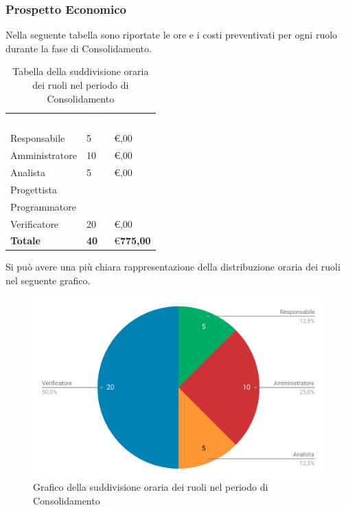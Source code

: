 \subsubsection{Prospetto Economico}
Nella seguente tabella sono riportate le ore e i costi preventivati per ogni ruolo durante la fase di Consolidamento.


\begin{table}[H]	
	\begin{center}
	    \begin{tabular}{C{4cm}C{1cm}C{3,5cm}}
			\textcolor{white}{\textbf{Ruolo}} & \textcolor{white}{\textbf{Ore}} & \textcolor{white}{\textbf{Costo}}
			\\
			Responsabile & 5 & \euro {},00 \\
			Amministratore & 10 & \euro {},00 \\
			Analista & 5 & \euro {},00 \\
			Progettista &  & \\
			Programmatore &  &  \\
			Verificatore & 20 & \euro {},00 \\
			\textbf{Totale} & \textbf{40} & \euro \space \textbf{775,00} \\
		\end{tabular}
	    \caption{Tabella della suddivisione oraria dei ruoli nel periodo di Consolidamento} \label{tab:tabellaRuoliConsolidamento} 
	\end{center}
\end{table}


Si può avere una più chiara rappresentazione della distribuzione oraria dei ruoli nel seguente grafico.

\begin{figure}[H]
	\includegraphics[width=1\linewidth]{Preventivo/grafici/CO2.pdf}
	\caption{Grafico della suddivisione oraria dei ruoli nel periodo di Consolidamento}
\end{figure}

